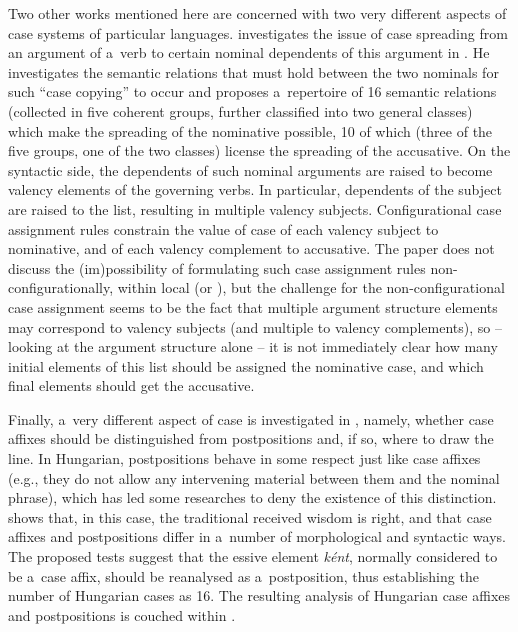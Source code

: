 \documentclass[output=paper
	        ,collection
	        ,collectionchapter
 	        ,biblatex
                ,babelshorthands
                ,newtxmath
                ,draftmode
                ,colorlinks, citecolor=brown
]{./langsci/langscibook}
\begin{document}
\begin{exe}
\begin{xlist}
\begin{exe}
\begin{xlist}
Two other works mentioned here are concerned with two very different aspects of case systems of particular languages.  \citet{ryu:13} investigates the issue of case spreading from an argument of a~verb to certain nominal dependents of this argument in .  He investigates the semantic relations that must hold between the two nominals for such “case copying” to occur and proposes a~repertoire of 16 semantic relations (collected in five coherent groups, further classified into two general classes) which make the spreading of the nominative possible, 10 of which (three of the five groups, one of the two classes) license the spreading of the accusative.  On the syntactic side, the dependents of such nominal arguments are raised to become valency elements of the governing verbs.  In particular, dependents of the subject are raised to the  list, resulting in multiple valency subjects.  Configurational case assignment rules constrain the value of case of each valency subject to nominative, and of each valency complement to accusative.  The paper does not discuss the (im)possibility of formulating such case assignment rules non-configurationally, within local  (or ), but the challenge for the non-configurational case assignment seems to be the fact that multiple argument structure elements may correspond to valency subjects (and multiple to valency complements), so – looking at the argument structure alone – it is not immediately clear how many initial elements of this list should be assigned the nominative case, and which final elements should get the accusative.

Finally, a~very different aspect of  case is investigated in \citet{thui:11}, namely, whether case affixes should be distinguished from postpositions and, if so, where to draw the line.  In Hungarian, postpositions behave in some respect just like case affixes (e.g., they do not allow any intervening material between them and the nominal phrase), which has led some researches to deny the existence of this distinction.  \citet{thui:11} shows that, in this case, the traditional received wisdom is right, and that case affixes and postpositions differ in a~number of morphological and syntactic ways.  The proposed tests suggest that the essive element \emph{k{\'e}nt}, normally considered to be a~case affix, should be reanalysed as a~postposition, thus establishing the number of Hungarian cases as 16.  The resulting analysis of Hungarian case affixes and postpositions is couched within  \citep{BS2012a-ed}.


\end{xlist}
\end{exe}
\end{xlist}
\end{exe}
\end{document}
